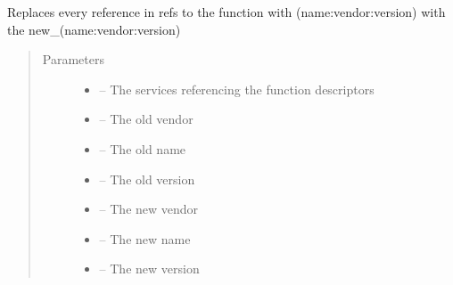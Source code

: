 \documentclass[letterpaper,10pt,english]{sphinxmanual}
\begin{document}

\begin{fulllineitems}
\label{_source/son_editor.impl:son_editor.impl.functionsimpl.get_uid}
\end{fulllineitems}


\begin{fulllineitems}
\label{_source/son_editor.impl:son_editor.impl.functionsimpl.replace_function_refs}
Replaces every reference in refs to the function with (name:vendor:version) with the new\_(name:vendor:version)
\begin{quote}\begin{description}
\item[{Parameters}] \leavevmode\begin{itemize}
\item {} 
 -- The services referencing the function descriptors

\item {} 
 -- The old vendor

\item {} 
 -- The old name

\item {} 
 -- The old version

\item {} 
 -- The new vendor

\item {} 
 -- The new name

\item {} 
 -- The new version

\end{itemize}

\end{description}\end{quote}

\end{fulllineitems}
\end{document}
